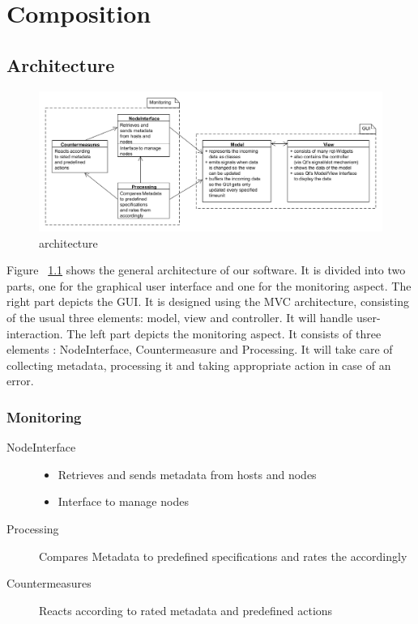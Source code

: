 \chapter{Composition}

\section{Architecture}

\begin{figure}[here]
\includegraphics[width=\linewidth]{./bilder/architektur.png}
\caption{architecture}
\label{fig:architecture}
\end{figure}

Figure ~\ref{fig:architecture} shows the general architecture of our software. It is divided into two parts, one for the graphical user interface and one for the monitoring aspect.
The right part depicts the GUI. It is designed using the MVC architecture, consisting of the usual three elements: model, view and controller. It will handle user-interaction.
The left part depicts the monitoring aspect. It consists of three elements : NodeInterface, Countermeasure and Processing. It will take care of collecting metadata, processing it and taking appropriate action in case of an error.

\subsection{Monitoring}

\begin{description}
	\item[NodeInterface] \mbox{}
		\begin{itemize}
			\item Retrieves and sends metadata from hosts and nodes
			\item Interface to manage nodes
		\end{itemize}
	\item[Processing] \mbox{} 
	Compares Metadata to predefined specifications and
	rates the accordingly
	\item[Countermeasures] \mbox{} 
	Reacts according to rated metadata and
	predefined actions
\end{description}

